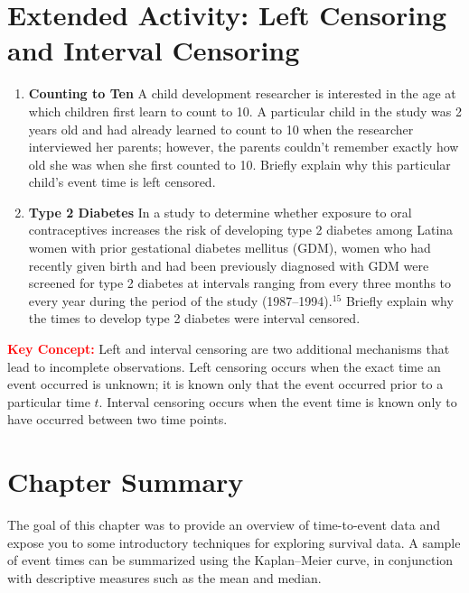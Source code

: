 \documentclass[
]{report}
\providecommand{\tightlist}{%
  \setlength{\itemsep}{0pt}\setlength{\parskip}{0pt}}
\begin{document}
\section*{Extended Activity: Left Censoring and Interval Censoring}\label{extended-activity-left-censoring-and-interval-censoring}

\begin{enumerate}
\def\labelenumi{\arabic{enumi}.}
\setcounter{enumi}{50}
\tightlist
\item
  \textbf{Counting to Ten} A child development researcher is interested in the age at which children first learn to count to 10. A particular child in the study was 2 years old and had already learned to count to 10 when the researcher interviewed her parents; however, the parents couldn't remember exactly how old she was when she first counted to 10. Briefly explain why this particular child's event time is left censored.\\
\item
  \textbf{Type 2 Diabetes} In a study to determine whether exposure to oral contraceptives increases the risk of developing type 2 diabetes among Latina women with prior gestational diabetes mellitus (GDM), women who had recently given birth and had been previously diagnosed with GDM were screened for type 2 diabetes at intervals ranging from every three months to every year during the period of the study (1987--1994).\(^{15}\) Briefly explain why the times to develop type 2 diabetes were interval censored.
\end{enumerate}

\Large

\textbf{\textcolor{red}{Key Concept:}}
\color{red}
Left and interval censoring are two additional mechanisms that lead to incomplete observations. Left censoring occurs when the exact time an event occurred is unknown; it is known only that the event occurred prior to a particular time \(t\). Interval censoring occurs when the event time is known only to have occurred between two time points.
\color{black}
\normalsize

\section*{\texorpdfstring{\textbf{Chapter Summary}}{Chapter Summary}}\label{chapter-summary-6}

The goal of this chapter was to provide an overview of time-to-event data and expose you to some introductory techniques for exploring survival data. A sample of event times can be summarized using the Kaplan--Meier curve, in conjunction with descriptive measures such as the mean and median.
\end{document}
